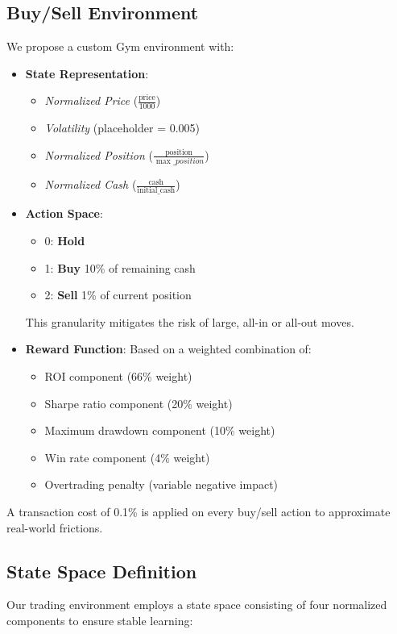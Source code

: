 \documentclass[11pt]{article}
\begin{document}
\subsection{Buy/Sell Environment}
We propose a custom Gym environment with:
\begin{itemize}
  \item \textbf{State Representation}: 
  \begin{itemize}
    \item \textit{Normalized Price} (\(\frac{\text{price}}{1000}\))
    \item \textit{Volatility} (placeholder = 0.005)
    \item \textit{Normalized Position} (\(\frac{\text{position}}{\max\_position}\))
    \item \textit{Normalized Cash} (\(\frac{\text{cash}}{\text{initial\_cash}}\))
  \end{itemize}
  \item \textbf{Action Space}: 
  \begin{itemize}
    \item 0: \textbf{Hold}
    \item 1: \textbf{Buy} 10\% of remaining cash
    \item 2: \textbf{Sell} 1\% of current position
  \end{itemize}
  This granularity mitigates the risk of large, all-in or all-out moves.
  \item \textbf{Reward Function}: Based on a weighted combination of:
  \begin{itemize}
    \item ROI component (66\% weight)
    \item Sharpe ratio component (20\% weight)
    \item Maximum drawdown component (10\% weight)
    \item Win rate component (4\% weight)
    \item Overtrading penalty (variable negative impact)
  \end{itemize}
\end{itemize}
A transaction cost of 0.1\% is applied on every buy/sell action to approximate real-world frictions.

\subsection{State Space Definition}
Our trading environment employs a state space consisting of four normalized components to ensure stable learning:
\end{document}
